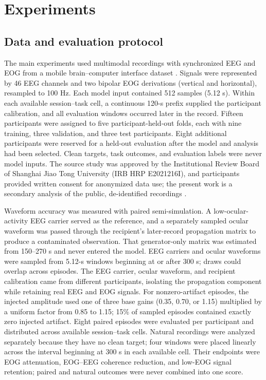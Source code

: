 \section{Experiments}
\label{sec:experiments}

\subsection{Data and evaluation protocol}

The main experiments used multimodal recordings with synchronized EEG and EOG from a mobile brain--computer interface dataset \cite{guttmannflury2025ocular,guttmannflury2024eyebci}. Signals were represented by 46 EEG channels and two bipolar EOG derivations (vertical and horizontal), resampled to 100 Hz. Each model input contained 512 samples (5.12 s). Within each available session--task cell, a continuous 120-s prefix supplied the participant calibration, and all evaluation windows occurred later in the record. Fifteen participants were assigned to five participant-held-out folds, each with nine training, three validation, and three test participants. Eight additional participants were reserved for a held-out evaluation after the model and analysis had been selected. Clean targets, task outcomes, and evaluation labels were never model inputs. The source study was approved by the Institutional Review Board of Shanghai Jiao Tong University (IRB HRP E2021216I), and participants provided written consent for anonymized data use; the present work is a secondary analysis of the public, de-identified recordings \cite{guttmannflury2025ocular}.

Waveform accuracy was measured with paired semi-simulation. A low-ocular-activity EEG carrier served as the reference, and a separately sampled ocular waveform was passed through the recipient's later-record propagation matrix to produce a contaminated observation. That generator-only matrix was estimated from 150--270 s and never entered the model. EEG carriers and ocular waveforms were sampled from 5.12-s windows beginning at or after 300 s; draws could overlap across episodes. The EEG carrier, ocular waveform, and recipient calibration came from different participants, isolating the propagation component while retaining real EEG and EOG signals. For nonzero-artifact episodes, the injected amplitude used one of three base gains (0.35, 0.70, or 1.15) multiplied by a uniform factor from 0.85 to 1.15; 15\% of sampled episodes contained exactly zero injected artifact. Eight paired episodes were evaluated per participant and distributed across available session--task cells. Natural recordings were analyzed separately because they have no clean target; four windows were placed linearly across the interval beginning at 300 s in each available cell. Their endpoints were EOG attenuation, EOG--EEG coherence reduction, and low-EOG signal retention; paired and natural outcomes were never combined into one score.

